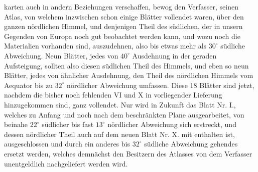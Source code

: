 \noindent karten auch in andern Beziehungen verschaffen, bewog den Verfasser, seinen Atlas, von welchem inzwischen schon einige Blätter vollendet waren, über den ganzen nördlichen Himmel, und denjenigen Theil des südlichen, der in unsern Gegenden von Europa noch gut beobachtet werden kann, und wozu noch die Materialien vorhanden sind, auszudehnen, also bis etwas mehr als $30^\circ$ südliche Abweichung. Neun Blätter, jedes von $40^\circ$ Ausdehnung in der geraden Aufsteigung, sollten also diesen südlichen Theil des Himmels, und eben so neun Blätter, jedes von ähnlicher Ausdehnung, den Theil des nördlichen Himmels vom Aequator bis zu $32^\circ$ nördlicher Abweichung umfassen. Diese 18 Blätter sind jetzt, nachdem die bisher noch fehlenden VI und X in vorliegender Lieferung hinzugekommen sind, ganz vollendet. Nur wird in Zukunft das Blatt Nr. I., welches zu Anfang und noch nach dem beschränkten Plane ausgearbeitet, von beinahe $22^\circ$ südlicher bis fast $13^\circ$ nördlicher Abweichung sich erstreckt, und dessen nördlicher Theil auch auf dem neuen Blatt Nr. X. mit enthalten ist, ausgeschlossen und durch ein anderes bis $32^\circ$ südliche Abweichung gehendes ersetzt werden, welches demnächst den Besitzern des Atlasses von dem Verfasser unentgeldlich nachgeliefert werden wird.

